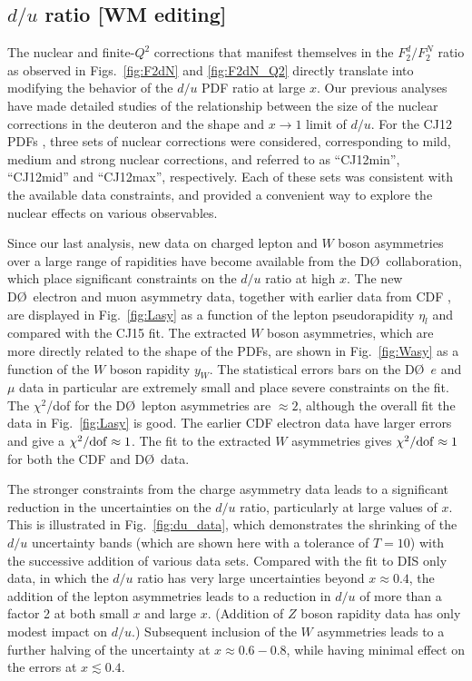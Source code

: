 \documentclass[aps,prd,amsmath,preprint]{revtex4}
\begin{document}
\subsection{$d/u$ ratio {\color{red} [WM editing]}}
\label{ssec:du}


The nuclear and finite-$Q^2$ corrections that manifest themselves
in the $F_2^d/F_2^N$ ratio as observed in Figs.~\ref{fig:F2dN} and
\ref{fig:F2dN_Q2} directly translate into modifying the behavior
of the $d/u$ PDF ratio at large $x$.  Our previous analyses
\cite{CJ10, CJ11, CJ12} have made detailed studies of the
relationship between the size of the nuclear corrections in
the deuteron and the shape and $x \to 1$ limit of $d/u$.
For the CJ12 PDFs \cite{CJ12}, three sets of nuclear corrections
were considered, corresponding to mild, medium and strong nuclear
corrections, and referred to as ``CJ12min'', ``CJ12mid'' and
``CJ12max'', respectively.  Each of these sets was consistent
with the available data constraints, and provided a convenient
way to explore the nuclear effects on various observables.


Since our last analysis, new data on charged lepton \cite{D0_mu,
D0_e} and $W$ boson asymmetries \cite{D0_W} over a large range
of rapidities have become available from the D\O\ collaboration,
which place significant constraints on the $d/u$ ratio at high $x$.
The new D\O\ electron and muon asymmetry data, together with earlier
data from CDF \cite{CDF_e}, are displayed in Fig.~\ref{fig:Lasy}
as a function of the lepton pseudorapidity $\eta_l$ and compared
with the CJ15 fit.
%
The extracted $W$ boson asymmetries, which are more directly
related to the shape of the PDFs, are shown in Fig.~\ref{fig:Wasy}
as a function of the $W$ boson rapidity $y_W$.  The statistical
errors bars on the D\O\ $e$ and $\mu$ data in particular are
extremely small and place severe constraints on the fit.
The $\chi^2$/dof for the D\O\ lepton asymmetries are $\approx 2$,
although the overall fit the data in Fig.~\ref{fig:Lasy} is good.
The earlier CDF electron data have larger errors and give a
$\chi^2/{\rm dof} \approx 1$.  The fit to the extracted $W$
asymmetries gives $\chi^2/{\rm dof} \approx 1$ for both the CDF
and D\O\ data.


The stronger constraints from the charge asymmetry data leads to
a significant reduction in the uncertainties on the $d/u$ ratio,
particularly at large values of $x$.  This is illustrated in
Fig.~\ref{fig:du_data}, which demonstrates the shrinking of the
$d/u$ uncertainty bands (which are shown here with a tolerance
of $T=10$) with the successive addition of various data sets.
Compared with the fit to DIS only data, in which the $d/u$ ratio
has very large uncertainties beyond $x \approx 0.4$, the addition
of the lepton asymmetries leads to a reduction in $d/u$ of more
than a factor 2 at both small $x$ and large $x$.
(Addition of $Z$ boson rapidity data \cite{CDFZ, D0Z} has only
modest impact on $d/u$.)
Subsequent inclusion of the $W$ asymmetries leads to a further
halving of the uncertainty at $x \approx 0.6-0.8$, while having
minimal effect on the errors at $x \lesssim 0.4$.
\end{document}
